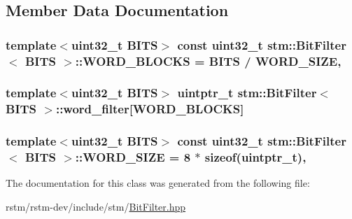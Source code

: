 \subsection{Member Data Documentation}
\hypertarget{classstm_1_1BitFilter_a7af8cead7398ad88d95b2e6e7a342636}{
\subsubsection[{W\-O\-R\-D\-\_\-\-B\-L\-O\-C\-K\-S}]{\setlength{\rightskip}{0pt plus 5cm}template$<$uint32\-\_\-t B\-I\-T\-S$>$ const uint32\-\_\-t {\bf stm\-::\-Bit\-Filter}$<$ {\bf B\-I\-T\-S} $>$\-::W\-O\-R\-D\-\_\-\-B\-L\-O\-C\-K\-S = {\bf B\-I\-T\-S} / {\bf W\-O\-R\-D\-\_\-\-S\-I\-Z\-E}\hspace{0.3cm}{\ttfamily [static]}, {\ttfamily [private]}}}\label{classstm_1_1BitFilter_a7af8cead7398ad88d95b2e6e7a342636}
\hypertarget{classstm_1_1BitFilter_a42af71c2d394c0ff906aae9a06913d51}{
\subsubsection[{word\-\_\-filter}]{\setlength{\rightskip}{0pt plus 5cm}template$<$uint32\-\_\-t B\-I\-T\-S$>$ uintptr\-\_\-t {\bf stm\-::\-Bit\-Filter}$<$ {\bf B\-I\-T\-S} $>$\-::word\-\_\-filter\mbox{[}{\bf W\-O\-R\-D\-\_\-\-B\-L\-O\-C\-K\-S}\mbox{]}}}\label{classstm_1_1BitFilter_a42af71c2d394c0ff906aae9a06913d51}
\hypertarget{classstm_1_1BitFilter_a699d8a0022afba29dc30045a5af8c87f}{
\subsubsection[{W\-O\-R\-D\-\_\-\-S\-I\-Z\-E}]{\setlength{\rightskip}{0pt plus 5cm}template$<$uint32\-\_\-t B\-I\-T\-S$>$ const uint32\-\_\-t {\bf stm\-::\-Bit\-Filter}$<$ {\bf B\-I\-T\-S} $>$\-::W\-O\-R\-D\-\_\-\-S\-I\-Z\-E = 8 $\ast$ sizeof(uintptr\-\_\-t)\hspace{0.3cm}{\ttfamily [static]}, {\ttfamily [private]}}}\label{classstm_1_1BitFilter_a699d8a0022afba29dc30045a5af8c87f}


The documentation for this class was generated from the following file\-:\begin{DoxyCompactItemize}
\item 
rstm/rstm-\/dev/include/stm/\hyperlink{BitFilter_8hpp}{Bit\-Filter.\-hpp}\end{DoxyCompactItemize}
